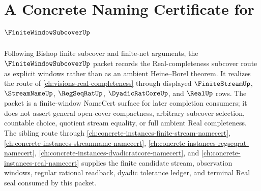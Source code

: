 \chapter{A Concrete Naming Certificate for $\FiniteWindowSubcoverUp$}
\label{ch:concrete-instances-finite-window-subcover-namecert}

Following Bishop finite subcover and finite-net arguments, the $\FiniteWindowSubcoverUp$ packet records the Real-completeness subcover route as explicit windows rather than as an ambient Heine--Borel theorem. It realizes the route of \autoref{ch:visions-real-completeness} through displayed $\FiniteStreamUp$, $\StreamNameUp$, $\RegSeqRatUp$, $\DyadicRatCoreUp$, and $\RealUp$ rows. The packet is a finite-window NameCert surface for later completion consumers; it does not assert general open-cover compactness, arbitrary subcover selection, countable choice, quotient stream equality, or full ambient Real completeness. The sibling route through \autoref{ch:concrete-instances-finite-stream-namecert}, \autoref{ch:concrete-instances-streamname-namecert}, \autoref{ch:concrete-instances-regseqrat-namecert}, \autoref{ch:concrete-instances-dyadicratcore-namecert}, and \autoref{ch:concrete-instances-real-namecert} supplies the finite candidate stream, observation windows, regular rational readback, dyadic tolerance ledger, and terminal Real seal consumed by this packet.

